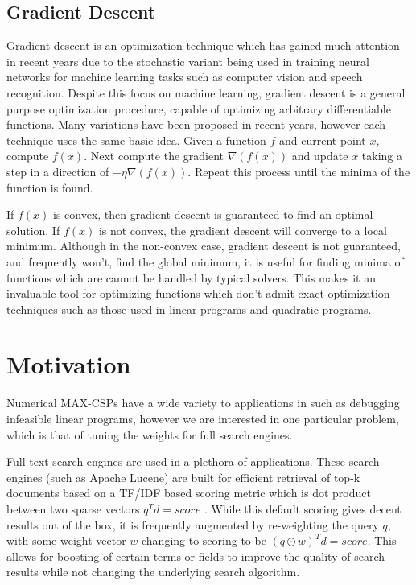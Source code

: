 \documentclass[a4paper]{article}
\begin{document}
\subsection{Gradient Descent}

Gradient descent is an optimization technique which has gained much 
attention in recent years due to the stochastic variant being used in training neural networks for machine learning 
tasks such as computer vision and speech recognition. Despite this focus on machine learning,
gradient descent is a general purpose optimization procedure, capable of optimizing arbitrary 
differentiable functions. Many variations have been proposed in recent years, however
each technique uses the same basic idea. Given a function $f$ and current point $x$, compute $f(x)$. 
Next compute the gradient $\nabla(f(x))$ and update $x$ taking a step in a direction of $-\eta \nabla(f(x))$. Repeat this 
process until the minima of the function is found. 

If $f(x)$ is convex, then gradient descent is guaranteed to find an optimal solution. If $f(x)$ is not convex, 
the gradient descent will converge to a local minimum. Although in the non-convex case, gradient descent 
is not guaranteed, and frequently won't, find the global minimum, it is useful for finding 
minima of functions which are cannot be handled by typical solvers.  This makes it an invaluable tool for 
optimizing functions which don't admit exact optimization techniques such as those used in 
linear programs and quadratic programs.

\section{Motivation}

Numerical MAX-CSPs have a wide variety to applications in such as debugging infeasible 
linear programs, however we are interested in one particular problem, which is that of 
tuning the weights for full search engines. 

Full text search engines are used in a plethora of applications. These search engines (such as Apache Lucene)
are built for efficient retrieval of top-k documents based on a TF/IDF based scoring metric which is dot 
product between two sparse vectors $q^Td = score$\cite{lucene_history} \cite{WAND_paper} \cite{block_max_WAND_paper}.
While this default scoring gives decent results out of the box, 
it is frequently augmented by re-weighting the query $q$, with some weight vector $w$
changing to scoring to be $(q\odot w)^Td = score$. This allows for boosting of certain terms or fields
to improve the quality of search results while not changing the underlying search algorithm. 
\end{document}
